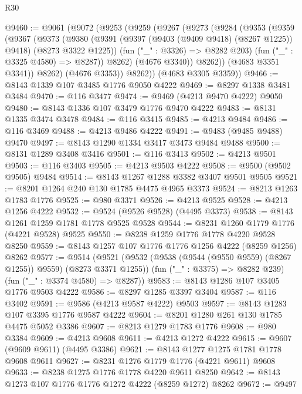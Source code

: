 \begin{lexlean}{R30}
\begin{coremodule}
@9460 := @9061
    (@9072
      (@9253
        (@9259
          (@9267
            (@9273
              (@9284
                (@9353
                  (@9359
                    (@9367
                      (@9373
                        (@9380
                          (@9391
                            (@9397 (@9403 (@9409 @9418) (@8267 @1225)) @9418)
                            (@8273 @3322 @1225))
                          (fun ("_" : @3326) => @8282 @203)
                          (fun ("_" : @3325 @4580) => @8287))
                        @8262)
                      (@4676 @3340))
                    @8262))
                (@4683 @3351 @3341))
              @8262)
            (@4676 @3353))
          @8262))
      (@4683 @3305 @3359))
@9466 := @8143 @1339 @107 @3485 @1776 @9050 @4222
@9469 := @8297 @1338 @3481 @3484
@9470 := @116 @3477
@9474 := @9469 (@4213 @9470 @4222) @9050
@9480 := @8143 @1336 @107 @3479 @1776 @9470 @4222
@9483 := @8131 @1335 @3474 @3478
@9484 := @116 @3415
@9485 := @4213 @9484
@9486 := @116 @3469
@9488 := @4213 @9486 @4222
@9491 := @9483 (@9485 @9488) @9470
@9497 := @8143 @1290 @1334 @3417 @3473 @9484 @9488
@9500 := @8131 @1289 @3408 @3416
@9501 := @116 @3413
@9502 := @4213 @9501
@9503 := @116 @3403
@9505 := @4213 @9503 @4222
@9508 := @9500 (@9502 @9505) @9484
@9514 := @8143 @1267 @1288 @3382 @3407 @9501 @9505
@9521 := @8201 @1264 @240 @130 @1785 @4475 @4965 @3373
@9524 := @8213 @1263 @1783 @1776
@9525 := @980 @3371
@9526 := @4213 @9525
@9528 := @4213 @1256 @4222
@9532 := @9524 (@9526 @9528) (@4495 @3373)
@9538 := @8143 @1261 @1259 @1781 @1778 @9525 @9528
@9544 := @8231 @1260 @1779 @1776 (@4221 @9528) @9525
@9550 := @8238 @1259 @1776 @1778 @4220 @9528 @8250
@9559 := @8143 @1257 @107 @1776 @1776 @1256 @4222 (@8259 @1256) @8262
@9577 := @9514
    (@9521
      (@9532 (@9538 (@9544 (@9550 @9559) (@8267 @1255)) @9559) (@8273 @3371 @1255))
      (fun ("_" : @3375) => @8282 @239)
      (fun ("_" : @3374 @4580) => @8287))
@9583 := @8143 @1286 @107 @3405 @1776 @9503 @4222
@9586 := @8297 @1285 @3397 @3404
@9587 := @116 @3402
@9591 := @9586 (@4213 @9587 @4222) @9503
@9597 := @8143 @1283 @107 @3395 @1776 @9587 @4222
@9604 := @8201 @1280 @261 @130 @1785 @4475 @5052 @3386
@9607 := @8213 @1279 @1783 @1776
@9608 := @980 @3384
@9609 := @4213 @9608
@9611 := @4213 @1272 @4222
@9615 := @9607 (@9609 @9611) (@4495 @3386)
@9621 := @8143 @1277 @1275 @1781 @1778 @9608 @9611
@9627 := @8231 @1276 @1779 @1776 (@4221 @9611) @9608
@9633 := @8238 @1275 @1776 @1778 @4220 @9611 @8250
@9642 := @8143 @1273 @107 @1776 @1776 @1272 @4222 (@8259 @1272) @8262
@9672 := @9497

\end{coremodule}
\end{lexlean}
